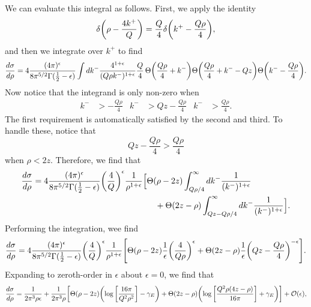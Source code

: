 \documentclass[11pt,twoside,reqno]{amsart}
\theoremstyle{plain}
\theoremstyle{remark}
\theoremstyle{definition}
\theoremstyle{remark}
\theoremstyle{definition}
\theoremstyle{definition}
\newcommand{\cO}{\mathcal{O}}
\begin{document}
We can evaluate this integral as follows. First, we apply the identity
\begin{equation}
	\delta\qty(\rho - \frac{4 k^+}{Q}) = \frac{Q}{4}\delta\qty(k^+ - \frac{Q\rho}{4}),
\end{equation}
and then we integrate over $k^+$ to find
\begin{equation}
\begin{aligned}
	\frac{d\sigma}{d\rho} = 4\frac{(4\pi)^\epsilon}{8\pi^{5/2}\Gamma(\frac{1}{2} - \epsilon)}
	\int dk^- 
	\frac{4^{1 + \epsilon}}{(Q\rho k^-)^{1 + \epsilon}} \frac{Q}{4} \, 
	\Theta\qty(\frac{Q\rho}{4} + k^-) 
	\Theta\qty(\frac{Q\rho}{4} + k^- - Qz)
	\Theta\qty(k^- - \frac{Q\rho}{4}).
\end{aligned}
\end{equation}
Now notice that the integrand is only non-zero when
\begin{align}
	k^- &> -\frac{Q\rho}{4} & k^- &> Qz - \frac{Q\rho}{4} & k^- &> \frac{Q\rho}{4}.
\end{align}
The first requirement is automatically satisfied by the second and third. To handle these, notice that
\begin{equation}
	Qz - \frac{Q\rho}{4} > \frac{Q\rho}{4}
\end{equation}
when $\rho < 2z$. Therefore, we find that
\begin{equation}
\begin{aligned}
	\frac{d\sigma}{d\rho} = 4\frac{(4\pi)^\epsilon}{8\pi^{5/2}\Gamma(\frac{1}{2} - \epsilon)} \qty(\frac{4}{Q})^\epsilon \frac{1}{\rho^{1 + \epsilon}} \Big[ & \Theta(\rho - 2z) \int_{Q\rho/4}^\infty dk^- \frac{1}{(k^-)^{1 + \epsilon}} \\
	&\quad + \Theta(2z - \rho) \int_{Qz - Q\rho/4}^\infty dk^- \frac{1}{(k^-)^{1 + \epsilon}} \Big].
\end{aligned}
\end{equation}
Performing the integration, wee find
\begin{equation}
\begin{aligned}
	\frac{d\sigma}{d\rho} = 4\frac{(4\pi)^\epsilon}{8\pi^{5/2}\Gamma(\frac{1}{2} - \epsilon)} \qty(\frac{4}{Q})^\epsilon \frac{1}{\rho^{1 + \epsilon}} \qty[ \Theta(\rho - 2z) \frac{1}{\epsilon}\qty(\frac{4}{Q\rho})^\epsilon + \Theta(2z - \rho) \frac{1}{\epsilon}\qty(Qz - \frac{Q\rho}{4})^{-\epsilon} ].
\end{aligned}
\end{equation}
Expanding to zeroth-order in $\epsilon$ about $\epsilon = 0$, we find that
\begin{equation}
\begin{aligned}
	\frac{d\sigma}{d\rho} = \frac{1}{2\pi^3 \rho \epsilon} + \frac{1}{2\pi^3 \rho} \qty[ \Theta(\rho - 2z) \qty(\log\qty[\frac{16 \pi}{Q^2 \rho^2}] - \gamma_E) + \Theta(2z - \rho) \qty(\log\qty[\frac{Q^2\rho(4z - \rho)}{16\pi}] + \gamma_E) ] + \cO(\epsilon),
\end{aligned}
\end{equation}
\end{document}
